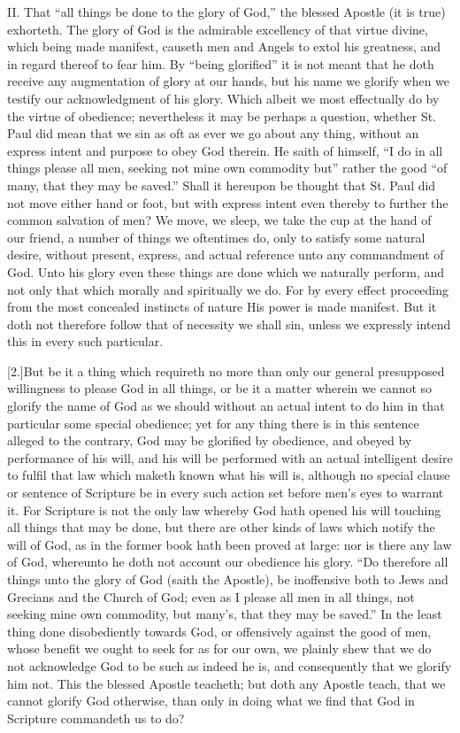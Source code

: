 II. That “all things be done to the glory of God,” the blessed Apostle (it is true) exhorteth. The glory of God is the admirable excellency of that virtue divine, which being made manifest, causeth men and Angels to extol his greatness,  and in regard thereof to fear him. By “being glorified” it is not meant that he doth receive any augmentation of glory at our hands, but his name we glorify when we testify our acknowledgment of his glory. Which albeit we most effectually do by the virtue of obedience; nevertheless it may be perhaps a question, whether St. Paul did mean that we sin as oft as ever we go about any thing, without an express intent and purpose to obey God therein. He saith of himself, “I do in all things please all men, seeking not mine own commodity but” rather the good “of many, that they may be saved.” Shall it hereupon be thought that St. Paul did not move either hand or foot, but with express intent even thereby to further the common salvation of men? We move, we sleep, we take the cup at the hand of our friend, a number of things we oftentimes do, only to satisfy some natural desire, without present, express, and actual reference unto any commandment of God. Unto his glory even these things are done which we naturally perform, and not only that which morally and spiritually we do. For by every effect proceeding from the most concealed instincts of nature His power is made manifest. But it doth not therefore follow that of necessity we shall sin, unless we expressly intend this in every such particular.

[2.]But be it a thing which requireth no more than only our general presupposed willingness to please God in all things, or be it a matter wherein we cannot so glorify the name of God as we should without an actual intent to do him in that particular some special obedience; yet for any thing there is in this sentence alleged to the contrary, God may be glorified by obedience, and obeyed by performance of his will, and his will be performed with an actual intelligent desire to fulfil that law which maketh known what his will is, although no special clause or sentence of Scripture be in every such action set before men’s eyes to warrant it. For Scripture is not the only law whereby God hath opened his will touching all things that may be done, but there are other kinds of laws which notify the will of God, as in the former book hath been proved at large: nor is there any law of God, whereunto he doth not account our obedience his glory. “Do therefore all  things unto the glory of God (saith the Apostle), be inoffensive both to Jews and Grecians and the Church of God; even as I please all men in all things, not seeking mine own commodity, but many’s, that they may be saved.” In the least thing done disobediently towards God, or offensively against the good of men, whose benefit we ought to seek for as for our own, we plainly shew that we do not acknowledge God to be such as indeed he is, and consequently that we glorify him not. This the blessed Apostle teacheth; but doth any Apostle teach, that we cannot glorify God otherwise, than only in doing what we find that God in Scripture commandeth us to do?

